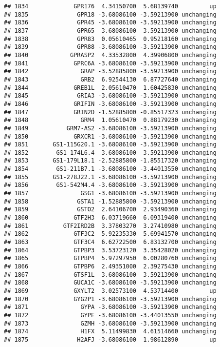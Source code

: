 \documentclass[]{article}
\begin{document}
\begin{verbatim}
## 1834             GPR176  4.34150700  5.68139740         up
## 1835              GPR18 -3.68086100 -3.59213900 unchanging
## 1836              GPR45 -3.68086100 -3.59213900 unchanging
## 1837              GPR65 -3.68086100 -3.59213900 unchanging
## 1838              GPR83  0.05610465  0.95218160 unchanging
## 1839              GPR88 -3.68086100 -3.59213900 unchanging
## 1840            GPRASP2  4.33532800  4.39906800 unchanging
## 1841             GPRC6A -3.68086100 -3.59213900 unchanging
## 1842               GRAP -3.52885800 -3.59213900 unchanging
## 1843               GRB2  6.92544130  6.87727640 unchanging
## 1844             GREB1L  2.05610470  1.60425830 unchanging
## 1845              GRIA3 -3.68086100 -3.59213900 unchanging
## 1846             GRIFIN -3.68086100 -3.59213900 unchanging
## 1847             GRIN2D -1.52885800 -0.85517323 unchanging
## 1848               GRM4  1.05610470  0.88179230 unchanging
## 1849           GRM7-AS2 -3.68086100 -3.59213900 unchanging
## 1850             GRXCR1 -3.68086100 -3.59213900 unchanging
## 1851       GS1-115G20.1 -3.68086100 -3.59213900 unchanging
## 1852        GS1-174L6.4 -3.68086100 -3.59213900 unchanging
## 1853       GS1-179L18.1 -2.52885800 -1.85517320 unchanging
## 1854        GS1-211B7.1 -3.68086100 -3.44013550 unchanging
## 1855       GS1-278J22.1 -3.68086100 -3.59213900 unchanging
## 1856        GS1-542M4.4 -3.68086100 -3.59213900 unchanging
## 1857               GSG1 -3.68086100 -3.59213900 unchanging
## 1858              GSTA1 -1.52885800 -3.59213900 unchanging
## 1859              GSTO2  2.64106700  2.93490360 unchanging
## 1860             GTF2H3  6.03719660  6.09319400 unchanging
## 1861          GTF2IRD2B  3.37803270  3.27410980 unchanging
## 1862             GTF3C2  5.92235330  5.69941570 unchanging
## 1863             GTF3C4  6.62722500  6.83132700 unchanging
## 1864             GTPBP3  3.53723120  3.35428020 unchanging
## 1865             GTPBP4  5.97297950  6.00280760 unchanging
## 1866             GTPBP6  2.49351000  2.39275430 unchanging
## 1867             GTSF1L -3.68086100 -3.59213900 unchanging
## 1868             GUCA1C -3.68086100 -3.59213900 unchanging
## 1869             GXYLT2  3.02573100  4.53714400         up
## 1870             GYG2P1 -3.68086100 -3.59213900 unchanging
## 1871               GYPA -3.68086100 -3.59213900 unchanging
## 1872               GYPE -3.68086100 -3.44013550 unchanging
## 1873               GZMH -3.68086100 -3.59213900 unchanging
## 1874               H1FX  5.11499830  4.61514660 unchanging
## 1875              H2AFJ -3.68086100  1.98612890         up

\end{verbatim}
\end{document}
